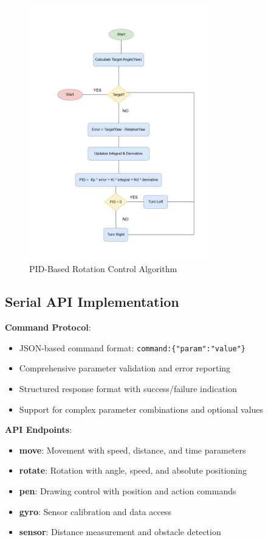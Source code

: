 \begin{figure}[H]
    \centering
    \includegraphics[width=0.7\textwidth]{assets/pid_algo_rotate.jpg}
    \caption{PID-Based Rotation Control Algorithm}
    \label{fig:pid_rotation}
\end{figure}

\subsection{Serial API Implementation}

\textbf{Command Protocol}:
\begin{itemize}
    \item JSON-based command format: \texttt{command:\{"param":"value"\}}
    \item Comprehensive parameter validation and error reporting
    \item Structured response format with success/failure indication
    \item Support for complex parameter combinations and optional values
\end{itemize}

\textbf{API Endpoints}:
\begin{itemize}
    \item \textbf{move}: Movement with speed, distance, and time parameters
    \item \textbf{rotate}: Rotation with angle, speed, and absolute positioning
    \item \textbf{pen}: Drawing control with position and action commands
    \item \textbf{gyro}: Sensor calibration and data access
    \item \textbf{sensor}: Distance measurement and obstacle detection
\end{itemize}

